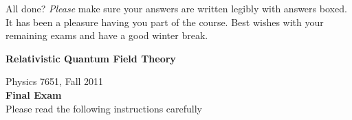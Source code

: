 \documentclass[12pt]{article}
\begin{document}
\begin{enumerate}


\end{enumerate}

\noindent All done? \textit{Please} make sure your answers are written legibly with answers boxed. It has been a pleasure having you part of the course. Best wishes with your remaining exams and have a good winter break.



\newpage

\vspace*{-1cm}
\begin{center}
{\LARGE \bf Relativistic Quantum Field Theory}

\vspace*{0.5cm}
{\Large Physics 7651, Fall 2011} \\
\vspace*{0.5cm}
{\Large {\bf Final Exam}\\
\vspace*{1cm}
Please read the following instructions carefully}
\end{center}
\end{document}
